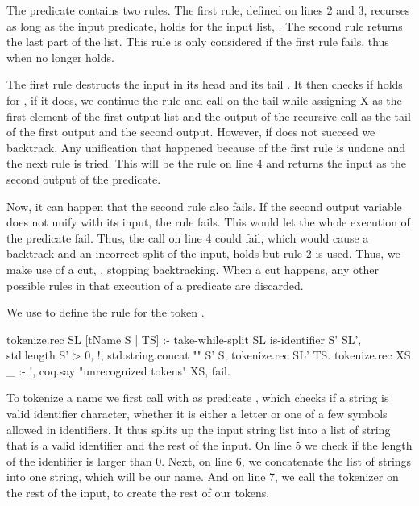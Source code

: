 \documentclass[thesis.tex]{subfiles}
\begin{document}
{{The predicate contains two rules. The first rule, defined on lines 2 and 3, recurses as long as the input predicate,  holds for the input list, \elpii{[X|XS]}. The second rule returns the last part of the list. This rule is only considered if the first rule fails, thus when  no longer holds.

The first rule destructs the input in its head  and its tail . It then checks if  holds for , if it does, we continue the rule and call  on the tail while assigning X as the first element of the first output list and the output of the recursive call as the tail of the first output and the second output. However, if  does not succeed we backtrack. Any unification that happened because of the first rule is undone and the next rule is tried. This will be the rule on line 4 and returns the input as the second output of the predicate.

Now, it can happen that the second rule also fails. If the second output variable does not unify with its input, the rule fails. This would let the whole execution of the predicate fail. Thus, the call on line 4 could fail, which would cause a backtrack and an incorrect split of the input,  holds but rule 2 is used. Thus, we make use of a cut, \elpii{!}, stopping backtracking. When a cut happens, any other possible rules in that execution of a predicate are discarded.

We use  to define the rule for the token .
\begin{elpicode}
  tokenize.rec SL [tName S | TS] :-
    take-while-split SL is-identifier S' SL',
    { std.length S' } > 0, !,
    std.string.concat "" S' S,
    tokenize.rec SL' TS.
  tokenize.rec XS _ :- !, 
    coq.say "unrecognized tokens" XS, fail.  
\end{elpicode}
To tokenize a name we first call  with as predicate , which checks if a string is valid identifier character, whether it is either a letter or one of a few symbols allowed in identifiers. It thus splits up the input string list into a list of string that is a valid identifier and the rest of the input. On line 5 we check if the length of the identifier is larger than 0. Next, on line 6, we concatenate the list of strings into one string, which will be our name. And on line 7, we call the tokenizer on the rest of the input, to create the rest of our tokens.

}}
\end{document}
